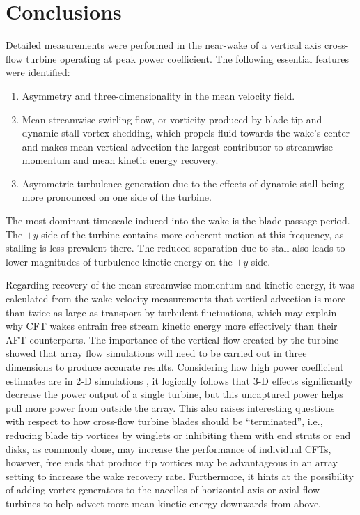 \section{Conclusions}

Detailed measurements were performed in the near-wake of a vertical axis
cross-flow turbine operating at peak power coefficient. The following essential
features were identified:

\begin{enumerate}
    \item Asymmetry and three-dimensionality in the mean velocity field. 
    
    \item Mean streamwise swirling flow, or vorticity produced by blade tip and
    dynamic stall vortex shedding, which propels fluid towards the wake's center
    and makes mean vertical advection the largest contributor to streamwise
    momentum and mean kinetic energy recovery.
    
    \item Asymmetric turbulence generation due to the effects of dynamic stall
    being more pronounced on one side of the turbine.
\end{enumerate}

The most dominant timescale induced into the wake is the blade passage period. 
The $+y$ side of the turbine contains more coherent motion at this
frequency, as stalling is less prevalent there. The reduced separation due to 
stall also leads to lower magnitudes of turbulence kinetic energy on the $+y$ 
side. 

Regarding recovery of the mean streamwise momentum and kinetic energy, it was
calculated from the wake velocity measurements that vertical advection is more
than twice as large as transport by turbulent fluctuations, which may explain
why CFT wakes entrain free stream kinetic energy more effectively than their AFT
counterparts. The importance of the vertical flow created by the turbine showed
that array flow simulations will need to be carried out in three dimensions to
produce accurate results. Considering how high power coefficient estimates are
in 2-D simulations \cite{Li2013}, it logically follows that 3-D effects
significantly decrease the power output of a single turbine, but this uncaptured
power helps pull more power from outside the array. This also raises interesting
questions with respect to how cross-flow turbine blades should be
``terminated'', i.e., reducing blade tip vortices by winglets or inhibiting them
with end struts or end disks, as commonly done, may increase the performance of
individual CFTs, however, free ends that produce tip vortices may be
advantageous in an array setting to increase the wake recovery rate.
Furthermore, it hints at the possibility of adding vortex generators to the
nacelles of horizontal-axis or axial-flow turbines to help advect more mean
kinetic energy downwards from above.

